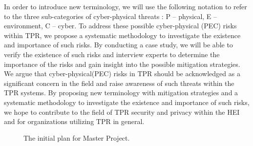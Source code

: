 In order to introduce new terminology, we will use the following notation to refer to the three sub-categories of cyber-physical threats
: P -- physical, E -- environment, C -- cyber. To address these possible cyber-physical (PEC) risks within \ac{TPR}, we
propose a systematic methodology to investigate the existence and importance of such risks. By conducting a case study, we will be able to
verify the existence of such risks and interview experts to determine the importance of the risks and gain insight into the possible
mitigation strategies. We argue that cyber-physical(PEC) risks in \ac{TPR} should be acknowledged as a significant concern in
the field and raise awareness of such threats within the \ac{TPR} systems. By proposing new terminology with
mitigation strategies and a systematic methodology to investigate the existence and importance of such risks, we hope to contribute to the
field of \ac{TPR} security and privacy within the \ac{HEI} and for organizations utilizing \ac{TPR} in general.

\begin{figure}
\centering
{}
\caption{The initial plan for Master Project.}
\label{fig:flowdiagram}
\end{figure}
